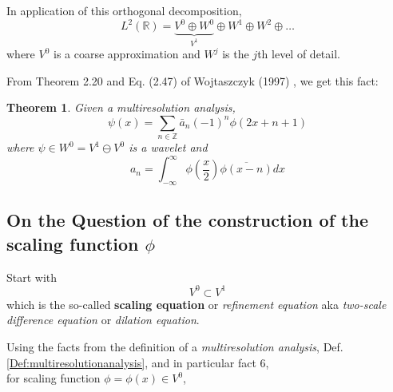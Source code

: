 \documentclass[twoside]{amsart}
\theoremstyle{plain}
\newtheorem{theorem}{Theorem}
\theoremstyle{definition}
\theoremstyle{remark}
\numberwithin{equation}{section}
\begin{document}
In application of this orthogonal decomposition,
\[
L^2(\mathbb{R}) = \underbrace{ V^0\oplus W^0}_{V^1} \oplus W^1 \oplus W^2 \oplus \dots 
\]
where $V^0$ is a coarse approximation and $W^j$ is the $j$th level of detail.  

From Theorem 2.20 and Eq. (2.47) of Wojtaszczyk (1997) \cite{PWojtaszczyk1997}, we get this fact:
\begin{theorem}
Given a multiresolution analysis, 
\begin{equation}
  \psi(x) = \sum_{n \in \mathbb{Z}} \bar{a}_n(-1)^n \phi(2x + n+1) 
\end{equation} where $\psi \in W^0 = V^1 \ominus V^0$ is a wavelet and 
\[
a_n = \int_{-\infty}^{\infty} \phi(\frac{x}{2}) \overline{ \phi(x-n)}dx
\]
\end{theorem}


\subsection{On the Question of the construction of the scaling function $\phi$}

Start with 
\begin{equation}
  V^0 \subset V^1
\end{equation}
which is the so-called \textbf{scaling equation} or \emph{refinement equation} aka \emph{two-scale difference equation} or \emph{dilation equation}.  

Using the facts from the definition of a \emph{multiresolution analysis}, Def. \ref{Def:multiresolutionanalysis}, and in particular fact 6, \\
for scaling function $\phi = \phi(x) \in V^0$, \\
\end{document}
